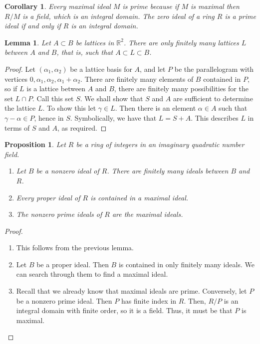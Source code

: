 \documentclass[12pt]{article}
\newtheorem{lem}[thm]{Lemma}  %
\newtheorem{cor}[thm]{Corollary}
\newtheorem{prop}[thm]{Proposition}
\theoremstyle{definition}
\theoremstyle{remark}
\numberwithin{equation}{section}
\newcommand\R{\mathbb R}    %
\begin{document}
\begin{cor}
        Every maximal ideal $M$ is prime because if $M$ is maximal then $R/M$ is a field, which is an integral domain. The zero ideal of a ring $R$ is a prime ideal if and only if $R$ is an integral domain.
\end{cor}

\vspace{15pt}

\begin{lem}
        Let $A \subset B$ be lattices in $\R^2$. There are only finitely many lattices $L$ between $A$ and $B$, that is, such that $A \subset L \subset B$.
\end{lem}
\begin{proof}
        Let $(\alpha_1,\alpha_2)$ be a lattice basis for $A$, and let $P$ be the parallelogram with vertices $0,\alpha_1,\alpha_2,\alpha_1+\alpha_2$. There are finitely many elements of $B$ contained in $P$, so if $L$ is a lattice between $A$ and $B$, there are finitely many possibilities for the set $L \cap P$. Call this set $S$. We shall show that $S$ and $A$ are sufficient to determine the lattice $L$. To show this let $\gamma\in L$. Then there is an element $\alpha \in A$ such that $\gamma - \alpha \in P$, hence in $S$. Symbolically, we have that $L = S + A$. This describes $L$ in terms of $S$ and $A$, as required.
\end{proof}


\vspace{15pt}


\begin{prop}
        Let $R$ be a ring of integers in an imaginary quadratic number field. \begin{enumerate}
                \item Let $B$ be a nonzero ideal of $R$. There are finitely many ideals between $B$ and $R$.
                \item Every proper ideal of $R$ is contained in a maximal ideal.
                \item The nonzero prime ideals of $R$ are the maximal ideals.
        \end{enumerate}
\end{prop}
\begin{proof}
        \begin{enumerate}
                \item This follows from the previous lemma.
                \item Let $B$ be a proper ideal. Then $B$ is contained in only finitely many ideals. We can search through them to find a maximal ideal.
                \item Recall that we already know that maximal ideals are prime. Conversely, let $P$ be a nonzero prime ideal. Then $P$ has finite index in $R$. Then, $R/P$ is an integral domain with finite order, so it is a field. Thus, it must be that $P$ is maximal.
        \end{enumerate}
\end{proof}
\end{document}

